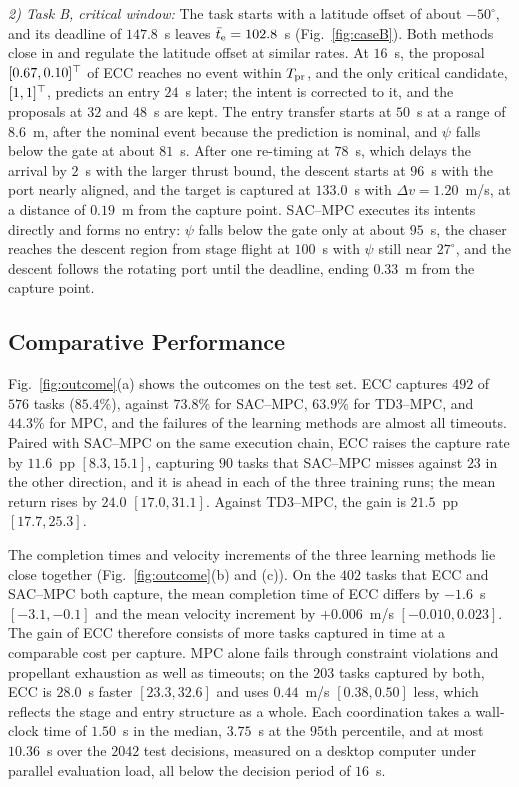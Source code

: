 \textit{2) Task B, critical window:} The task starts with a latitude offset of about $-50^{\circ}$, and its deadline of $147.8$~s leaves $\bar t_{\mathrm{e}}=102.8$~s (Fig.~\ref{fig:caseB}). Both methods close in and regulate the latitude offset at similar rates. At $16$~s, the proposal $[0.67,0.10]^{\top}$ of ECC reaches no event within $T_{\mathrm{pr}}$, and the only critical candidate, $[1,1]^{\top}$, predicts an entry $24$~s later; the intent is corrected to it, and the proposals at $32$ and $48$~s are kept. The entry transfer starts at $50$~s at a range of $8.6$~m, after the nominal event because the prediction is nominal, and $\psi$ falls below the gate at about $81$~s. After one re-timing at $78$~s, which delays the arrival by $2$~s with the larger thrust bound, the descent starts at $96$~s with the port nearly aligned, and the target is captured at $133.0$~s with $\Delta v=1.20$~m/s, at a distance of $0.19$~m from the capture point. SAC--MPC executes its intents directly and forms no entry: $\psi$ falls below the gate only at about $95$~s, the chaser reaches the descent region from stage flight at $100$~s with $\psi$ still near $27^{\circ}$, and the descent follows the rotating port until the deadline, ending $0.33$~m from the capture point.

\subsection{Comparative Performance}\label{sec:main}

Fig.~\ref{fig:outcome}(a) shows the outcomes on the test set. ECC captures $492$ of $576$ tasks ($85.4\%$), against $73.8\%$ for SAC--MPC, $63.9\%$ for TD3--MPC, and $44.3\%$ for MPC, and the failures of the learning methods are almost all timeouts. Paired with SAC--MPC on the same execution chain, ECC raises the capture rate by $11.6$~pp $[8.3,15.1]$, capturing $90$ tasks that SAC--MPC misses against $23$ in the other direction, and it is ahead in each of the three training runs; the mean return rises by $24.0$ $[17.0,31.1]$. Against TD3--MPC, the gain is $21.5$~pp $[17.7,25.3]$.

The completion times and velocity increments of the three learning methods lie close together (Fig.~\ref{fig:outcome}(b) and (c)). On the $402$ tasks that ECC and SAC--MPC both capture, the mean completion time of ECC differs by $-1.6$~s $[-3.1,-0.1]$ and the mean velocity increment by $+0.006$~m/s $[-0.010,0.023]$. The gain of ECC therefore consists of more tasks captured in time at a comparable cost per capture. MPC alone fails through constraint violations and propellant exhaustion as well as timeouts; on the $203$ tasks captured by both, ECC is $28.0$~s faster $[23.3,32.6]$ and uses $0.44$~m/s $[0.38,0.50]$ less, which reflects the stage and entry structure as a whole. Each coordination takes a wall-clock time of $1.50$~s in the median, $3.75$~s at the $95$th percentile, and at most $10.36$~s over the $2042$ test decisions, measured on a desktop computer under parallel evaluation load, all below the decision period of $16$~s.

